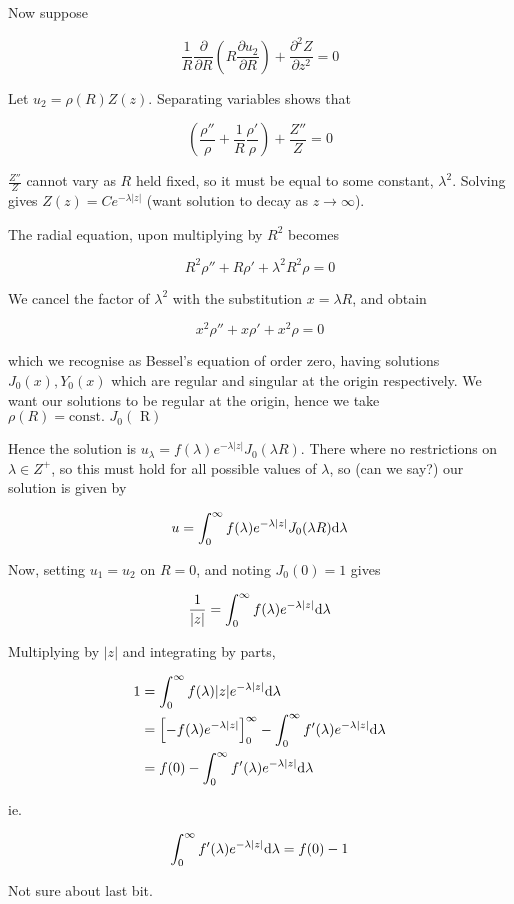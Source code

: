 \documentclass[a4paper]{article}
\begin{document}
Now suppose 

\[ \frac{1}{R} \frac{\partial }{\partial R} \left(  R \frac{\partial u_{2} }{\partial R} \right) + \frac{\partial^{2} Z }{\partial z^{2}}  = 0\]

Let $ u_{2} = \rho(R)Z(z) $.  Separating variables shows that

\[ \left(  \frac{\rho''}{\rho} + \frac{1}{R} \frac{\rho'}{\rho} \right) + \frac{Z''}{Z} = 0  \]

$ \frac{Z''}{Z} $ cannot vary as $ R $ held fixed, so it must be equal to some constant, $ \lambda^{2} $. Solving gives $ Z(z) = C e^{-\lambda| z |} $ (want solution to decay as $ z \to \infty $).

The radial equation, upon multiplying by $ R^{2} $ becomes

\[ R^{2} \rho'' + R \rho' + \lambda^{2} R^{2}  \rho = 0 \]

We cancel the factor of $ \lambda^{2} $ with the substitution $ x = \lambda R  $, and obtain 

\[ x^{2} \rho'' + x \rho' + x^{2} \rho = 0 \]

which we recognise as Bessel's equation of order zero, having solutions $ J_{0}(x), Y_{0}(x) $ which are regular and singular at the origin respectively. We want our solutions to be regular at the origin, hence we take $ \rho(R) = \text{const. }J_{0}(\text{ R}) $

Hence the solution is $ u_{\lambda} = f(\lambda) e^{-\lambda | z |} J_{0} (\lambda R) $. There where no restrictions on $ \lambda \in Z^{+} $, so this must hold for all possible values of $ \lambda $, so (can we say?) our solution is given by

\[ u = \int_{0}^{\infty} f(\lambda) e^{-\lambda | z |} J_{0} (\lambda R) \mathrm{d} \lambda  \]

Now, setting $ u_{1} = u_{2} $ on $ R = 0 $, and noting $ J_{0}(0) = 1 $ gives

\[ \frac{1}{| z |} = \int_{0}^{\infty} f(\lambda) e^{-\lambda | z |} \mathrm{d} \lambda \]

Multiplying by $ | z | $ and integrating by parts,

\begin{align*}
1 & = \int_{0}^{\infty} f(\lambda) | z |e^{-\lambda | z |} \mathrm{d} \lambda \\
& = \left[ - f(\lambda) e^{-\lambda | z |}  \right]_{0}^{\infty} - \int_{0}^{\infty} f'(\lambda) e^{-\lambda | z |} \mathrm{d} \lambda \\
& = f(0)  - \int_{0}^{\infty} f'(\lambda) e^{-\lambda | z |} \mathrm{d} \lambda
\end{align*}

ie.

\[  \int_{0}^{\infty} f'(\lambda) e^{-\lambda | z |} \mathrm{d} \lambda = f(0) - 1\]

Not sure about last bit.
\end{document}
